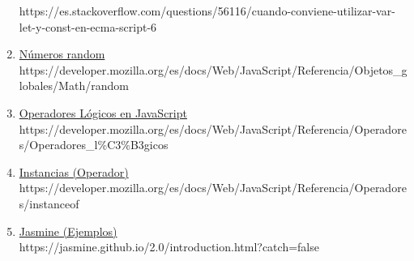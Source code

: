 \documentclass{article}
\begin{document}
\begin{enumerate}
    \textsf{https://es.stackoverflow.com/questions/56116/cuando-conviene-utilizar-var-let-y-const-en-ecma-script-6}
    \item \href{https://developer.mozilla.org/es/docs/Web/JavaScript/Referencia/Objetos_globales/Math/random}{Números random}\\
    \textsf{https://developer.mozilla.org/es/docs/Web/JavaScript/Referencia/Objetos\_globales/Math/random}
    \item \href{https://developer.mozilla.org/es/docs/Web/JavaScript/Referencia/Operadores/Operadores_l\%C3\%B3gicos}{Operadores Lógicos en JavaScript}\\
    \textsf{https://developer.mozilla.org/es/docs/Web/JavaScript/Referencia/Operadores/Operadores\_l\%C3\%B3gicos}
    \item \href{https://developer.mozilla.org/es/docs/Web/JavaScript/Referencia/Operadores/instanceof}{Instancias (Operador)}\\
    \textsf{https://developer.mozilla.org/es/docs/Web/JavaScript/Referencia/Operadores/instanceof}
    \item \href{https://jasmine.github.io/2.0/introduction.html?catch=false}{Jasmine (Ejemplos)}\\
    \textsf{https://jasmine.github.io/2.0/introduction.html?catch=false}
\end{enumerate}
\end{document}
